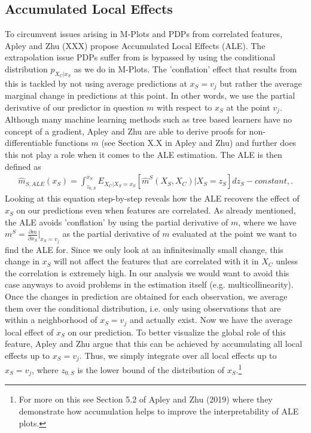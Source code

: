 \subsection{Accumulated Local Effects}
To circumvent issues arising in M-Plots and PDPs from correlated features, Apley and Zhu (XXX) propose Accumulated Local Effects (ALE). The extrapolation issue PDPs suffer from is bypassed by using the conditional distribution $p_{X_C|x_S}$ as we do in M-Plots. The 'conflation' effect that results from this is tackled by not using average predictions at $x_S=v_j$ but rather the average marginal change in predictions at this point. In other words, we use the partial derivative of our predictor in question $m$ with respect to $x_S$ at the point $v_j$. Although many machine learning methods such as tree based learners have no concept of a gradient, Apley and Zhu are able to derive proofs for non-differentiable functions $m$ (see Section X.X in Apley and Zhu) and further does this not play a role when it comes to the ALE estimation. The ALE is then defined as
\begin{align}
\hat{m}_{S, ALE} (x_S)=\int_{z_{0, S}}^{x_S} E_{X_C|X_S=x_S}[\hat{m}^S(X_S, X_C)|X_S=z_S]dz_S - constant, \label{eq:ale}.
\end{align}
Looking at this equation step-by-step reveals how the ALE recovers the effect of $x_S$ on our predictions even when features are correlated. As already mentioned, the ALE avoids 'conflation' by using the partial derivative of $m$, where we have $m^S=\frac{\partial m}{\partial x_S}\rvert_{x_S=v_j}$ as the partial derivative of $m$ evaluated at the point we want to find the ALE for. Since we only look at an infinitesimally small change, this change in $x_S$ will not affect the features that are correlated with it in $X_C$ unless the correlation is extremely high. In our analysis we would want to avoid this case anyways to avoid problems in the estimation itself (e.g. multicollinearity). Once the changes in prediction are obtained for each observation, we average them over the conditional distribution, i.e. only using observations that are within a neighborhood of $x_S=v_j$ and actually exist. Now we have the average local effect of $x_S$ on our prediction. To better visualize the global role of this feature, Apley and Zhu argue that this can be achieved by accumulating all local effects up to $x_S=v_j$. Thus, we simply integrate over all local effects up to $x_S=v_j$, where $z_{0, S}$ is the lower bound of the distribution of $x_S$.\footnote{For more on this see Section 5.2 of Apley and Zhu (2019) where they demonstrate how accumulation helps to improve the interpretability of ALE plots.} \\
